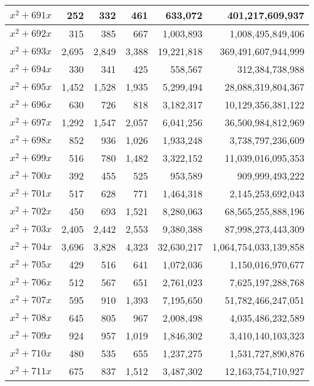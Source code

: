 \documentclass[a4paper]{amsproc}
\theoremstyle{plain}
\begin{document}
\begin{longtable}{ | l | r | r | r | r | r | }
$x^2 + 691x$ & 252 & 332 & 461 & 633{,}072 & 401{,}217{,}609{,}937 \\ \hline
$x^2 + 692x$ & 315 & 385 & 667 & 1{,}003{,}893 & 1{,}008{,}495{,}849{,}406 \\ \hline
$x^2 + 693x$ & 2{,}695 & 2{,}849 & 3{,}388 & 19{,}221{,}818 & 369{,}491{,}607{,}944{,}999 \\ \hline
$x^2 + 694x$ & 330 & 341 & 425 & 558{,}567 & 312{,}384{,}738{,}988 \\ \hline
$x^2 + 695x$ & 1{,}452 & 1{,}528 & 1{,}935 & 5{,}299{,}494 & 28{,}088{,}319{,}804{,}367 \\ \hline
$x^2 + 696x$ & 630 & 726 & 818 & 3{,}182{,}317 & 10{,}129{,}356{,}381{,}122 \\ \hline
$x^2 + 697x$ & 1{,}292 & 1{,}547 & 2{,}057 & 6{,}041{,}256 & 36{,}500{,}984{,}812{,}969 \\ \hline
$x^2 + 698x$ & 852 & 936 & 1{,}026 & 1{,}933{,}248 & 3{,}738{,}797{,}236{,}609 \\ \hline
$x^2 + 699x$ & 516 & 780 & 1{,}482 & 3{,}322{,}152 & 11{,}039{,}016{,}095{,}353 \\ \hline
$x^2 + 700x$ & 392 & 455 & 525 & 953{,}589 & 909{,}999{,}493{,}222 \\ \hline
$x^2 + 701x$ & 517 & 628 & 771 & 1{,}464{,}318 & 2{,}145{,}253{,}692{,}043 \\ \hline
$x^2 + 702x$ & 450 & 693 & 1{,}521 & 8{,}280{,}063 & 68{,}565{,}255{,}888{,}196 \\ \hline
$x^2 + 703x$ & 2{,}405 & 2{,}442 & 2{,}553 & 9{,}380{,}388 & 87{,}998{,}273{,}443{,}309 \\ \hline
$x^2 + 704x$ & 3{,}696 & 3{,}828 & 4{,}323 & 32{,}630{,}217 & 1{,}064{,}754{,}033{,}139{,}858 \\ \hline
$x^2 + 705x$ & 429 & 516 & 641 & 1{,}072{,}036 & 1{,}150{,}016{,}970{,}677 \\ \hline
$x^2 + 706x$ & 512 & 567 & 651 & 2{,}761{,}023 & 7{,}625{,}197{,}288{,}768 \\ \hline
$x^2 + 707x$ & 595 & 910 & 1{,}393 & 7{,}195{,}650 & 51{,}782{,}466{,}247{,}051 \\ \hline
$x^2 + 708x$ & 645 & 805 & 967 & 2{,}008{,}498 & 4{,}035{,}486{,}232{,}589 \\ \hline
$x^2 + 709x$ & 924 & 957 & 1{,}019 & 1{,}846{,}302 & 3{,}410{,}140{,}103{,}323 \\ \hline
$x^2 + 710x$ & 480 & 535 & 655 & 1{,}237{,}275 & 1{,}531{,}727{,}890{,}876 \\ \hline
$x^2 + 711x$ & 675 & 837 & 1{,}512 & 3{,}487{,}302 & 12{,}163{,}754{,}710{,}927 \\ \hline

\end{longtable}
\end{document}
